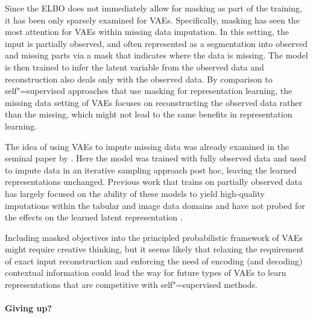 Since the ELBO does not immediately allow for masking as part of the training, it has been only sparsely examined for VAEs. Specifically, masking has seen the most attention for VAEs within missing data imputation. In this setting, the input is partially observed, and often represented as a segmentation into observed and missing parts via a mask that indicates where the data is missing. The model is then trained to infer the latent variable from the observed data and reconstruction also deals only with the observed data. 
By comparison to self"=supervised approaches that use masking for representation learning, the missing data setting of VAEs focuses on reconstructing the observed data rather than the missing, which might not lead to the same benefits in representation learning. 

The idea of using VAEs to impute missing data was already examined in the seminal paper by \textcite{rezende_stochastic_2014}. Here the model was trained with fully observed data and used to impute data in an iterative sampling approach post hoc, leaving the learned representations unchanged.
Previous work that trains on partially observed data has largely focused on the ability of these models to yield high-quality imputations within the tabular and image data domains and have not probed for the effects on the learned latent representation \parencite{mattei_miwae_2019, ipsen_not-miwae_2021}. 

Including masked objectives into the principled probabilistic framework of VAEs might require creative thinking, but it seems likely that relaxing the requirement of exact input reconstruction and enforcing the need of encoding (and decoding) contextual information could lead the way for future types of VAEs to learn representations that are competitive with self"=supervised methods.


\paragraph{Giving up?}



\parencite{tomczak_trouble_2022}
\parencite{huszar_is_2017}





